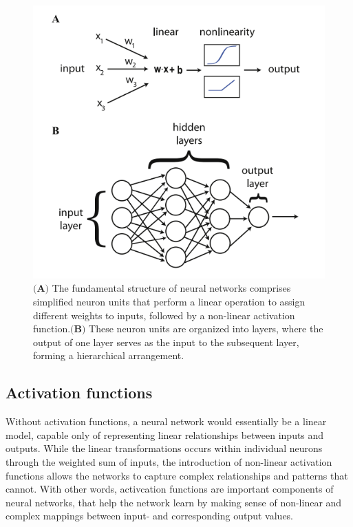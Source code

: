 \documentclass[a4paper, UKenglish, 11pt]{uiomaster}
\begin{document}
\begin{figure}
    \centering
    \includegraphics[width=\linewidth]{figures/basic_architecture.png}
    \caption{$\textbf{(A)}$ The fundamental structure of neural networks comprises simplified neuron units that perform a linear operation to assign different weights to inputs, followed by a non-linear activation function.$\textbf{(B)}$ These neuron units are organized into layers, where the output of one layer serves as the input to the subsequent layer, forming a hierarchical arrangement.}
    \label{fig:NN_basic_architecture}
\end{figure}

\subsection{Activation functions}
Without activation functions, a neural network would essentially be a linear model, capable only of representing linear relationships between inputs and outputs. While the linear transformations occurs within individual neurons through the weighted sum of inputs, the introduction of non-linear activation functions allows the networks to capture complex relationships and patterns that cannot. With other words, activcation functions are important components of neural networks, that help the network learn by making sense of non-linear and complex mappings between input- and corresponding output values.
\end{document}
